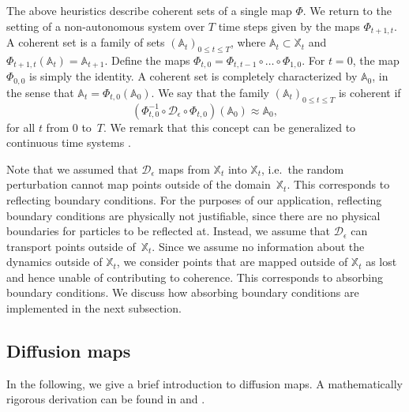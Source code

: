 The above heuristics describe coherent sets of a single map $\Phi$. We return to the setting of a non-autonomous system over $T$ time steps given by the maps $\Phi_{t+1,t}$. A coherent set is a family of sets $(\mathbb{A}_t)_{0\leq t \leq T}$, where $\mathbb{A}_t\subset \mathbb{X}_t$ and $\Phi_{t+1, t} (\mathbb{A}_t) = \mathbb{A}_{t+1}$. Define the maps $\Phi_{t,0}=\Phi_{t, t-1}\circ \hdots \circ \Phi_{1,0}$. For $t=0$, the map $\Phi_{0,0}$ is simply the identity. A coherent set is completely characterized by $\mathbb{A}_0$, in the sense that $\mathbb{A}_t=\Phi_{t,0} (\mathbb{A}_0)$. We say that the family $(\mathbb{A}_t)_{0\leq t \leq T}$ is coherent if
\begin{equation}\label{eq:coherent_heuristic}
    (\Phi_{t,0}^{-1} \circ \mathcal{D}_\epsilon \circ \Phi_{t,0} )(\mathbb{A}_0) \approx \mathbb{A}_0,
\end{equation}
for all $t$ from $0$ to~$T$. We remark that this concept can be generalized to continuous time systems \parencite[e.g.,~][]{matthesComputingCoherentSets2016}.

Note that we assumed that $\mathcal{D}_\epsilon$ maps from $\mathbb{X}_t$ into $\mathbb{X}_t$, i.e.~the random perturbation cannot map points outside of the domain~$\mathbb{X}_t$. This corresponds to reflecting boundary conditions. For the purposes of our application, reflecting boundary conditions are physically not justifiable, since there are no physical boundaries for particles to be reflected at. Instead, we assume that $\mathcal{D}_\epsilon$ can transport points outside of~$\mathbb{X}_t$. Since we assume no information about the dynamics outside of $\mathbb{X}_t$, we consider points that are mapped outside of $\mathbb{X}_t$ as lost and hence unable of contributing to coherence. This corresponds to absorbing boundary conditions. We discuss how absorbing boundary conditions are implemented in the next subsection.

\subsection{Diffusion maps}\label{sec:CS_diffMaps}
In the following, we give a brief introduction to diffusion maps. A mathematically rigorous derivation can be found in \textcite{coifmanDiffusionMaps2006} and \textcite{ghojoghLaplacianBasedDimensionalityReduction2022}.

